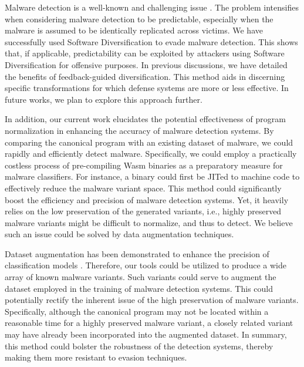 \begin{strategy}

    Malware detection is a well-known and challenging issue \cite{cohen1987computer}. 
    The problem intensifies when considering malware detection to be predictable, especially when the malware is assumed to be identically replicated across victims. 
    We have successfully used Software Diversification to evade malware detection. 
    This shows that, if applicable, predictability can be exploited by attackers using Software Diversification for offensive purposes. 
    In previous discussions, we have detailed the benefits of feedback-guided diversification. 
    This method aids in discerning specific transformations for which defense systems are more or less effective.
    In future works, we plan to explore this approach further.

    In addition, our current work elucidates the potential effectiveness of program normalization in enhancing the accuracy of malware detection systems. 
    By comparing the canonical program with an existing dataset of malware, we could rapidly and efficiently detect malware.
    Specifically, we could employ a practically costless process of pre-compiling Wasm binaries as a preparatory measure for malware classifiers. 
    For instance, a \wasm binary could first be JITed to machine code to effectively reduce the malware variant space. 
    This method could significantly boost the efficiency and precision of malware detection systems. 
    Yet, it heavily relies on the low preservation of the generated variants, i.e., highly preserved malware variants might be difficult to normalize, and thus to detect.
    We believe such an issue could be solved by data augmentation techniques.

    Dataset augmentation has been demonstrated to enhance the precision of classification models \cite{2021arXiv210311882S, selfAPR, 10.1109/TSE.2023.3240118}.
    Therefore, our tools could be utilized to produce a wide array of known malware variants.
    Such variants could serve to augment the dataset employed in the training of malware detection systems.
    This could potentially rectify the inherent issue of the high preservation of malware variants.
    Specifically, although the canonical program may not be located within a reasonable time for a highly preserved malware variant, a closely related variant may have already been incorporated into the augmented dataset.
    In summary, this method could bolster the robustness of the detection systems, thereby making them more resistant to evasion techniques.



\end{strategy}


